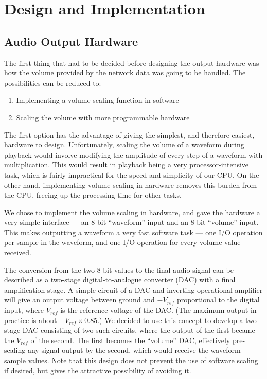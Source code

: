 \chapter{Design and Implementation}

\section{Audio Output Hardware}
\label{sec:design:hardware}

The first thing that had to be decided before designing the output hardware was how the volume 
provided by the network data was going to be handled.  The possibilities can be reduced to:
\begin{enumerate}
\item Implementing a volume scaling function in software
\item Scaling the volume with more programmable hardware
\end{enumerate}
The first option has the advantage of giving the simplest, and therefore easiest, hardware to 
design.  Unfortunately, scaling the volume of a waveform during playback would involve modifying the 
amplitude of every step of a waveform with multiplication.  This would result in playback being a 
very processor-intensive task, which is fairly impractical for the speed and simplicity of our CPU.  
On the other hand, implementing volume scaling in hardware removes this burden from the CPU, freeing 
up the processing time for other tasks.

We chose to implement the volume scaling in hardware, and gave the hardware a very simple interface 
--- an 8-bit ``waveform'' input and an 8-bit ``volume'' input.  This makes outputting a waveform a 
very fast software task --- one I/O operation per sample in the waveform, and one I/O operation for 
every volume value received.

The conversion from the two 8-bit values to the final audio signal can be described as a two-stage 
digital-to-analogue converter (DAC) with a final amplification stage.  A simple circuit of a DAC and 
inverting operational amplifier will give an output voltage between ground and $-V_{ref}$ 
proportional to the digital input, where $V_{ref}$ is the reference voltage of the DAC.  (The 
maximum output in practice is about $-V_{ref}\times0.85$.)  We decided to use this concept to 
develop a two-stage DAC consisting of two such circuits, where the output of the first became the 
$V_{ref}$ of the second.  The first becomes the ``volume'' DAC, effectively pre-scaling any signal 
output by the second, which would receive the waveform sample values.  Note that this design does 
not prevent the use of software scaling if desired, but gives the attractive possibility of avoiding 
it.


